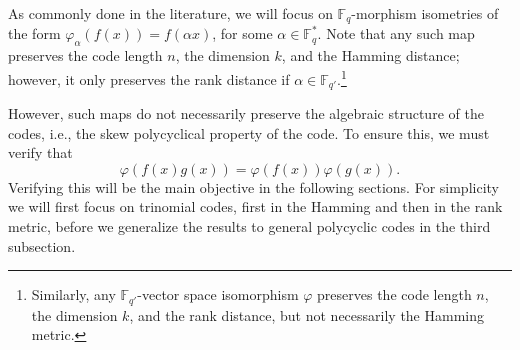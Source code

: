 \documentclass[12pt,paper]{article}
\theoremstyle{plain}
\newcommand{\Fq}{\mathbb{F}_{q}}
\begin{document}
As commonly done in the literature, we will focus on $\Fq$-morphism isometries of the form  $\varphi_{\alpha}(f(x)) = f(\alpha x)$, for some $\alpha \in \mathbb{F}_q^*$. Note that any such map preserves the code length $n$, the dimension $k$, and the Hamming distance; however, it only preserves the rank distance if $\alpha\in \mathbb{F}_{q'}$.\footnote{Similarly, any $ \mathbb{F}_{q'}$-vector space isomorphism $\varphi$ preserves the code length $n$, the dimension $k$, and the rank distance, but not necessarily the Hamming metric.}

However, such maps do not necessarily preserve the algebraic structure of the codes, i.e., the skew polycyclical property  of the code. To ensure this, we must verify that
$$
\varphi(f(x)  g(x)) = \varphi(f(x))  \varphi(g(x)).
$$
Verifying this will be the main objective in the following sections. For simplicity we will first focus on trinomial codes, first in the Hamming and then in the rank metric, before we generalize the results to general polycyclic codes in the third subsection.
\end{document}
